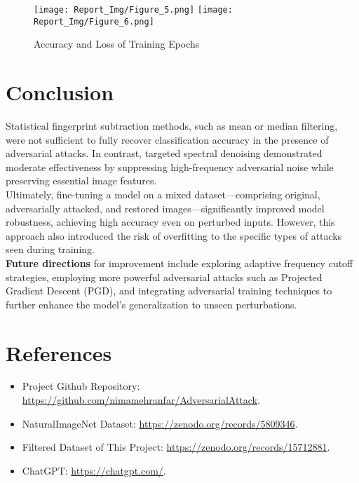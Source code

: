 \documentclass[a4paper,12pt]{report}%
\begin{document}
\begin{figure}[!htb]
  \texttt{[image: Report\_Img/Figure\_5.png]}
\endminipage\hfill
{}
  \texttt{[image: Report\_Img/Figure\_6.png]}
\endminipage\hfill
  \caption{Accuracy and Loss of Training Epochs}\label{fig:training_metrics}
\end{figure}


\newpage

\chapter{Conclusion}
Statistical fingerprint subtraction methods, such as mean or median filtering, were not sufficient to fully recover classification accuracy in the presence of adversarial attacks. In contrast, targeted spectral denoising demonstrated moderate effectiveness by suppressing high-frequency adversarial noise while preserving essential image features.\\
\hfill \break
Ultimately, fine-tuning a model on a mixed dataset—comprising original, adversarially attacked, and restored images—significantly improved model robustness, achieving high accuracy even on perturbed inputs. However, this approach also introduced the risk of overfitting to the specific types of attacks seen during training.\\
\hfill \break
\textbf{Future directions} for improvement include exploring adaptive frequency cutoff strategies, employing more powerful adversarial attacks such as Projected Gradient Descent (PGD), and integrating adversarial training techniques to further enhance the model’s generalization to unseen perturbations.


\newpage

\chapter{References}
\begin{itemize}
    \item Project Github Repository: \url{https://github.com/nimamehranfar/AdversarialAttack}.
    \item NaturalImageNet Dataset: \url{https://zenodo.org/records/5809346}.
    \item Filtered Dataset of This Project: \url{https://zenodo.org/records/15712881}.
    \item ChatGPT: \url{https://chatgpt.com/}.
\end{itemize}
\end{document}
